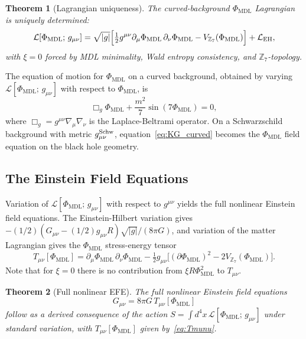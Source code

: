 \documentclass[11pt]{article}
\newtheorem{theorem}{Theorem}[section]
\theoremstyle{remark}
\newcommand{\PHIMDL}{\Phi_{\mathrm{MDL}}}
\newcommand{\ZS}{\mathbb{Z}_7}
\newcommand{\Gmunu}{G_{\mu\nu}}
\newcommand{\Tmunu}{T_{\mu\nu}}
\newcommand{\LL}{\mathcal{L}}
\begin{document}
\begin{theorem}[Lagrangian uniqueness]
\label{thm:lagrangian}
The curved-background $\PHIMDL$ Lagrangian is uniquely determined:
\begin{equation}
  \LL[\PHIMDL;\,g_{\mu\nu}] = \sqrt{|g|}\Bigl[
    \tfrac{1}{2}g^{\mu\nu}\partial_\mu\PHIMDL\,\partial_\nu\PHIMDL
    - V_{\ZS}(\PHIMDL)
    \Bigr] + \LL_{\rm EH},
  \label{eq:L_final}
\end{equation}
with $\xi=0$ forced by MDL minimality, Wald entropy consistency, and $\ZS$-topology.
\end{theorem}

The equation of motion for $\PHIMDL$ on a curved background, obtained by varying
$\LL[\PHIMDL;\,g_{\mu\nu}]$ with respect to $\PHIMDL$, is
\begin{equation}
  \Box_g\PHIMDL + \frac{m^2}{7}\sin(7\PHIMDL) = 0,
  \label{eq:KG_curved}
\end{equation}
where $\Box_g = g^{\mu\nu}\nabla_\mu\nabla_\nu$ is the Laplace-Beltrami operator.  On a
Schwarzschild background with metric $g_{\mu\nu}^{\rm Schw}$, equation~\eqref{eq:KG_curved}
becomes the $\PHIMDL$ field equation on the black hole geometry.

\subsection{The Einstein Field Equations}
\label{sec:efe}

Variation of $\LL[\PHIMDL;\,g_{\mu\nu}]$ with respect to $g^{\mu\nu}$ yields the
full nonlinear Einstein field equations.  The Einstein-Hilbert variation gives
$-(1/2)(\Gmunu - (1/2)g_{\mu\nu}R)\sqrt{|g|}/(8\pi G)$, and variation of the matter
Lagrangian gives the $\PHIMDL$ stress-energy tensor
\begin{equation}
  \Tmunu[\PHIMDL] = \partial_\mu\PHIMDL\,\partial_\nu\PHIMDL
    - \tfrac{1}{2}g_{\mu\nu}\bigl[(\partial\PHIMDL)^2 - 2V_{\ZS}(\PHIMDL)\bigr].
  \label{eq:Tmunu}
\end{equation}
Note that for $\xi=0$ there is no contribution from $\xi R\PHIMDL^2$ to $\Tmunu$.

\begin{theorem}[Full nonlinear EFE]
\label{thm:efe}
The full nonlinear Einstein field equations
\begin{equation}
  \Gmunu = 8\pi G\,\Tmunu[\PHIMDL]
  \label{eq:EFE}
\end{equation}
follow as a derived consequence of the action $S = \int d^4x\,\LL[\PHIMDL;\,g_{\mu\nu}]$
under standard variation, with $\Tmunu[\PHIMDL]$ given by~\eqref{eq:Tmunu}.
\end{theorem}
\end{document}
